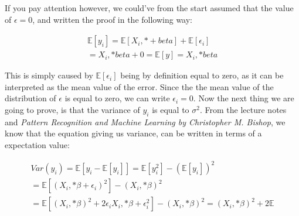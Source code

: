 \documentclass[a4paper, 10pt]{article}
\begin{document}
If you pay attention however, we could've from the start assumed that the value of $\epsilon=0$, and written the proof in the following way: 

\begin{gather*}
	\mathbb{E}[y_i] = \mathbb{E}[X_i,*+beta] + \mathbb{E}[\epsilon_i] \\
						= X_i,*beta + 0 = \mathbb{E}[y] = X_i,*beta
\end{gather*}

This is simply caused by $\mathbb{E}[\epsilon_i]$ being by definition equal to zero, as it can be interpreted as the mean value of the error. Since the the mean value of the distribution of $\epsilon$ is equal to zero, we can write $\epsilon_i=0$. Now the next thing we are going to prove, is that the variance of $y_i$ is equal to $\sigma^2$. From the lecture notes and \emph{Pattern Recognition and Machine Learning by Christopher M. Bishop}, we know that the equation giving us variance, can be written in terms of a expectation value: 

\begin{gather*}
			Var(y_i) = \mathbb{E}[y_i - \mathbb{E}[y_i]] = \mathbb{E}[y_i^2] - (\mathbb{E}[y_i])^2 \\
										= \mathbb{E}[(X_i,*\beta + \epsilon_i)^2] - (X_i,*\beta)^2 \\
										= \mathbb{E}[(X_i,*\beta)^2 + 2\epsilon_iX_i,*\beta + \epsilon_i^2] - (X_i,*\beta)^2
										= (X_i,*\beta)^2 + 2\mathbb{E}
\end{gather*}
\end{document}
